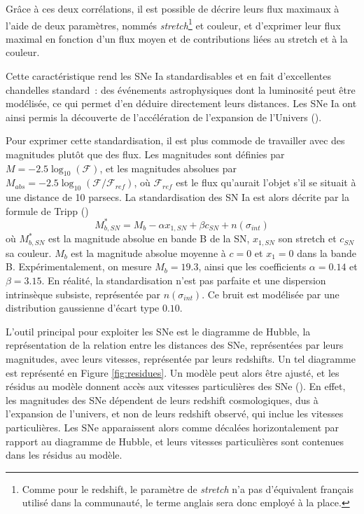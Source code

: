 \documentclass{book}
\let\mcl\mathcal
\begin{document}
Grâce à ces deux corrélations, il est possible de décrire leurs flux maximaux à l'aide de deux paramètres, nommés \textit{stretch}\footnote{Comme pour le redshift, le paramètre de \textit{stretch} n'a pas d'équivalent français utilisé dans la communauté, le terme anglais sera donc employé à la place.} et couleur, et d'exprimer leur flux maximal en fonction d'un flux moyen et de contributions liées au stretch et à la couleur.

Cette caractéristique rend les SNe Ia standardisables et en fait d'excellentes chandelles standard~: des événements astrophysiques dont la luminosité peut être modélisée, ce qui permet d'en déduire directement leurs distances. Les SNe Ia ont ainsi permis la découverte de l'accélération de l'expansion de l'Univers (\cite{perlmutter_cosmology_1998, riess_observational_1998}).

Pour exprimer cette standardisation, il est plus commode de travailler avec des magnitudes plutôt que des flux. Les magnitudes sont définies par $M=-2.5\log_{10}(\mcl F)$, et les magnitudes absolues par $M_{abs} = -2.5 \log_{10}(\mcl F /\mcl F_{ref})$, où $\mcl F_{ref}$ est le flux qu'aurait l'objet s'il se situait à une distance de 10 parsecs. La standardisation des SN Ia est alors décrite par la formule de Tripp (\cite{tripp_two-parameter_1998})
\begin{equation}
\label{eq:tripp}
    M^*_{b,SN} = M_b - \alpha x_{1,SN} + \beta c_{SN} + n(\sigma_{int})
\end{equation}
où $M^*_{b,SN}$ est la magnitude absolue en bande B de la SN, $x_{1,SN}$ son stretch et $c_{SN}$ sa couleur. $M_b$ est la magnitude absolue moyenne à $c=0$ et $x_1=0$ dans la bande B. Expérimentalement, on mesure $M_b=19.3$, ainsi que les coefficients $\alpha=0.14$ et $\beta=3.15$. En réalité, la standardisation n'est pas parfaite et une dispersion intrinsèque subsiste, représentée par $n(\sigma_{int})$. Ce bruit est modélisée par une distribution gaussienne d'écart type $0.10$.

L'outil principal pour exploiter les SNe est le diagramme de Hubble, la représentation de la relation entre les distances des SNe, représentées par leurs magnitudes, avec leurs vitesses, représentée par leurs redshifts. Un tel diagramme est représenté en Figure \ref{fig:residues}. Un modèle peut alors être ajusté, et les résidus au modèle donnent accès aux vitesses particulières des SNe (\cite{davis_effect_2011}). En effet, les magnitudes des SNe dépendent de leurs redshift cosmologiques, dus à l'expansion de l'univers, et non de leurs redshift observé, qui inclue les vitesses particulières. Les SNe apparaissent alors comme décalées horizontalement par rapport au diagramme de Hubble, et leurs vitesses particulières sont contenues dans les résidus au modèle.
\end{document}
